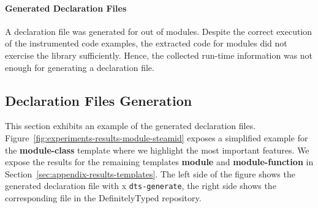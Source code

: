 \documentclass[sigplan,screen]{acmart}
\newcommand{\secref}[1]{Section~\ref{#1}}
\newcommand{\figref}[1]{Figure~\ref{#1}}
\begin{document}
\paragraph*{Generated Declaration Files}
A declaration file was generated for \CountModulesGeneratedDeclarationFile{} out of \CountModulesRunTimeInfoExtracted{} modules. Despite the correct execution
of the instrumented code examples, the extracted code for
\CountModulesDeclarationFileCouldNotBeGenerated{} modules did 
not exercise the library sufficiently. Hence, the collected run-time information was not enough
for generating a declaration file. 

\subsection{Declaration Files Generation}
\label{sec:experiments-declaration-files-generation}

This section exhibits an example of the \CountModulesGeneratedDeclarationFile{} generated
declaration files. \figref{fig:experiments-results-module-steamid} exposes a simplified example for the
\textbf{module-class} template where we highlight the most important features.
We expose the results for the remaining templates \textbf{module} and \textbf{module-function} in
\secref{sec:appendix-results-templates}.
The left side of the figure shows
the generated declaration file with x
\lstinline{dts-generate}, the right side shows the corresponding file
in the DefinitelyTyped repository. 
\end{document}
